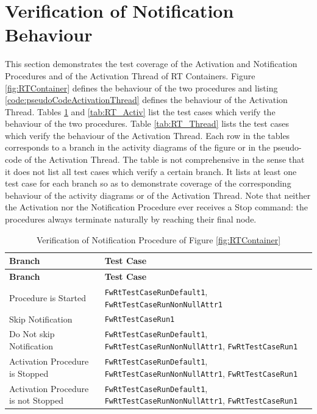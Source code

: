 \documentclass[a4paper,10pt]{article}
\let\stdsection\section
\renewcommand\section{\newpage\stdsection}
\begin{document}
\section{Verification of Notification Behaviour}\label{Appendix_E_RT_Notif}
This section demonstrates the test coverage of the Activation and Notification Procedures and of the Activation Thread of RT Containers. Figure \ref{fig:RTContainer} defines the behaviour of the two procedures and listing \ref{code:pseudoCodeActivationThread} defines the behaviour of the Activation Thread.
Tables \ref{tab:RT_Notif} and \ref{tab:RT_Activ} list the test cases which verify the behaviour of the two procedures. Table \ref{tab:RT_Thread} lists the test cases which verify the behaviour of the Activation Thread. Each row in the tables corresponds to a branch in the activity diagrams of the figure or in the pseudo-code of the Activation Thread. The table is not comprehensive in the sense that it does not list all test cases which verify a certain branch. It lists at least one test case for each branch so as to demonstrate coverage of the corresponding behaviour of the activity diagrams or of the Activation Thread. Note that neither the Activation nor the Notification Procedure ever receives a Stop command: the procedures always terminate naturally by reaching their final node.


\begin{longtable}{|p{5.7cm}|p{5.5cm}|}
\caption{Verification of Notification Procedure of Figure \ref{fig:RTContainer}}
\label{tab:RT_Notif} \\
\hline
\rowcolor{gray}
\textbf{Branch} & \textbf{Test Case} \\
\hline
\endfirsthead
\rowcolor{gray}
\textbf{Branch} & \textbf{Test Case} \\
\hline
\endhead
Procedure is Started & \texttt{FwRtTestCaseRunDefault1}, \texttt{FwRtTestCaseRunNonNullAttr1} \\
\hline
Skip Notification & \texttt{FwRtTestCaseRun1} \\
\hline
Do Not skip Notification & \texttt{FwRtTestCaseRunDefault1}, \texttt{FwRtTestCaseRunNonNullAttr1}, \texttt{FwRtTestCaseRun1} \\
\hline
Activation Procedure is Stopped & \texttt{FwRtTestCaseRunDefault1}, \texttt{FwRtTestCaseRunNonNullAttr1}, \texttt{FwRtTestCaseRun1}\\
\hline
Activation Procedure is not Stopped & \texttt{FwRtTestCaseRunDefault1}, \texttt{FwRtTestCaseRunNonNullAttr1}, \texttt{FwRtTestCaseRun1}\\
\hline
\end{longtable}
\end{document}
